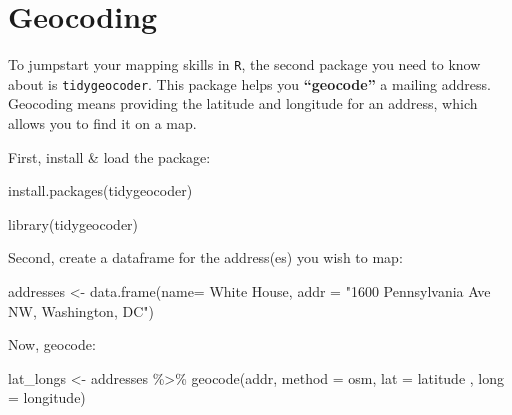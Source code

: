 \documentclass[
]{book}
\newenvironment{Shaded}{\begin{snugshade}}{\end{snugshade}}
\newcommand{\AttributeTok}[1]{\textcolor[rgb]{0.77,0.63,0.00}{#1}}
\newcommand{\FunctionTok}[1]{\textcolor[rgb]{0.00,0.00,0.00}{#1}}
\newcommand{\NormalTok}[1]{#1}
\newcommand{\OtherTok}[1]{\textcolor[rgb]{0.56,0.35,0.01}{#1}}
\newcommand{\SpecialCharTok}[1]{\textcolor[rgb]{0.00,0.00,0.00}{#1}}
\newcommand{\StringTok}[1]{\textcolor[rgb]{0.31,0.60,0.02}{#1}}
\begin{document}
\hypertarget{geocoding}{%
\section*{Geocoding}\label{geocoding}}

To jumpstart your mapping skills in \texttt{R}, the second package you need to know about is \texttt{tidygeocoder}. This package helps you \textbf{``geocode''} a mailing address. Geocoding means providing the latitude and longitude for an address, which allows you to find it on a map.

First, install \& load the package:

\begin{Shaded}
\begin{Highlighting}[]
\FunctionTok{install.packages}\NormalTok{(}\StringTok{\textquotesingle{}tidygeocoder\textquotesingle{}}\NormalTok{)}
\end{Highlighting}
\end{Shaded}

\begin{Shaded}
\begin{Highlighting}[]
\FunctionTok{library}\NormalTok{(tidygeocoder)}
\end{Highlighting}
\end{Shaded}

Second, create a dataframe for the address(es) you wish to map:

\begin{Shaded}
\begin{Highlighting}[]
\NormalTok{addresses }\OtherTok{\textless{}{-}} \FunctionTok{data.frame}\NormalTok{(}\AttributeTok{name=} \StringTok{\textquotesingle{}White House\textquotesingle{}}\NormalTok{, }
                        \AttributeTok{addr =} \StringTok{"1600 Pennsylvania Ave NW, Washington, DC"}\NormalTok{)}
\end{Highlighting}
\end{Shaded}

Now, geocode:

\begin{Shaded}
\begin{Highlighting}[]
\NormalTok{lat\_longs }\OtherTok{\textless{}{-}}\NormalTok{ addresses }\SpecialCharTok{\%\textgreater{}\%}
    \FunctionTok{geocode}\NormalTok{(addr, }\AttributeTok{method =} \StringTok{\textquotesingle{}osm\textquotesingle{}}\NormalTok{, }\AttributeTok{lat =}\NormalTok{ latitude , }\AttributeTok{long =}\NormalTok{ longitude)}
\end{Highlighting}
\end{Shaded}
\end{document}
